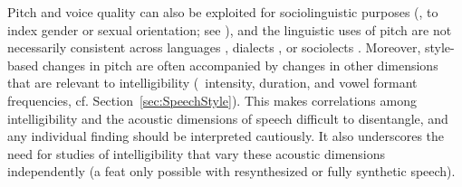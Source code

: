 Pitch and voice quality can also be exploited for sociolinguistic purposes (\ie, to index gender or sexual orientation; see \citealt[\intal]{McconnellGinet1978, Gaudio1994, Podesva2011}), and the linguistic uses of pitch are not necessarily consistent across languages \citep{MajewskiEtAl1972, Todaka1993, Yuasa2008, KeatingKuo2012}, dialects \citep{GrabePost2002, ClopperSmiljanic2011}, or sociolects \citep{McLemore1991, Britain2008}.  %
Moreover, style-based changes in pitch are often accompanied by changes in other dimensions that are relevant to intelligibility (\viz\ intensity, duration, and vowel formant frequencies, cf. Section~\ref{sec:SpeechStyle}).  This makes correlations among intelligibility and the acoustic dimensions of speech difficult to disentangle, and any individual finding should be interpreted cautiously.  It also underscores the need for studies of intelligibility that vary these acoustic dimensions independently (a feat only possible with resynthesized or fully synthetic speech).


